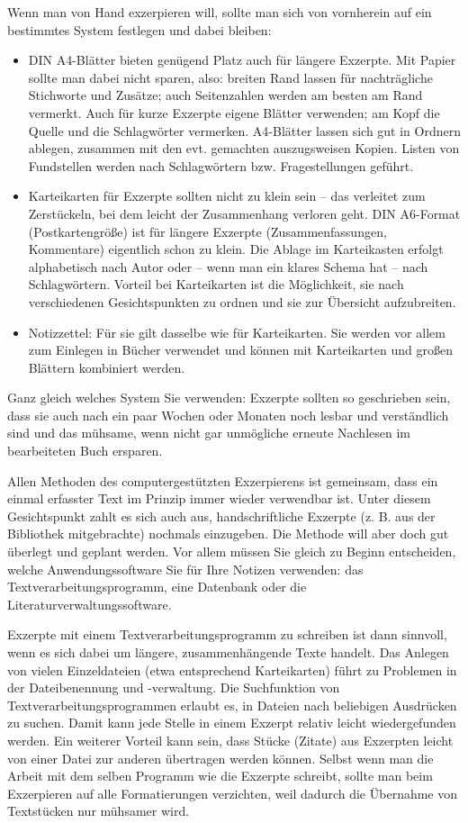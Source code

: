 \documentclass[]{book}
\providecommand{\tightlist}{%
  \setlength{\itemsep}{0pt}\setlength{\parskip}{0pt}}
\theoremstyle{definition}
\theoremstyle{definition}
\theoremstyle{definition}
\theoremstyle{remark}
\begin{document}
Wenn man von Hand exzerpieren will, sollte man sich von vornherein auf
ein bestimmtes System festlegen und dabei bleiben:

\begin{itemize}
\tightlist
\item
  DIN A4-Blätter bieten genügend Platz auch für längere Exzerpte. Mit
  Papier sollte man dabei nicht sparen, also: breiten Rand lassen für
  nachträgliche Stichworte und Zusätze; auch Seitenzahlen werden am
  besten am Rand vermerkt. Auch für kurze Exzerpte eigene Blätter
  verwenden; am Kopf die Quelle und die Schlagwörter vermerken.
  A4-Blätter lassen sich gut in Ordnern ablegen, zusammen mit den evt.
  gemachten auszugsweisen Kopien. Listen von Fundstellen werden nach
  Schlagwörtern bzw. Fragestellungen geführt.
\item
  Karteikarten für Exzerpte sollten nicht zu klein sein -- das verleitet
  zum Zerstückeln, bei dem leicht der Zusammenhang verloren geht. DIN
  A6-Format (Postkartengröße) ist für längere Exzerpte
  (Zusammenfassungen, Kommentare) eigentlich schon zu klein. Die Ablage
  im Karteikasten erfolgt alphabetisch nach Autor oder -- wenn man ein
  klares Schema hat -- nach Schlagwörtern. Vorteil bei Karteikarten ist
  die Möglichkeit, sie nach verschiedenen Gesichtspunkten zu ordnen und
  sie zur Übersicht aufzubreiten.
\item
  Notizzettel: Für sie gilt dasselbe wie für Karteikarten. Sie werden
  vor allem zum Einlegen in Bücher verwendet und können mit Karteikarten
  und großen Blättern kombiniert werden.
\end{itemize}

Ganz gleich welches System Sie verwenden: Exzerpte sollten so
geschrieben sein, dass sie auch nach ein paar Wochen oder Monaten noch
lesbar und verständlich sind und das mühsame, wenn nicht gar unmögliche
erneute Nachlesen im bearbeiteten Buch ersparen.

Allen Methoden des computergestützten Exzerpierens ist gemeinsam, dass
ein einmal erfasster Text im Prinzip immer wieder verwendbar ist. Unter
diesem Gesichtspunkt zahlt es sich auch aus, handschriftliche Exzerpte
(z. B. aus der Bibliothek mitgebrachte) nochmals einzugeben. Die Methode
will aber doch gut überlegt und geplant werden. Vor allem müssen Sie
gleich zu Beginn entscheiden, welche Anwendungssoftware Sie für Ihre
Notizen verwenden: das Textverarbeitungsprogramm, eine Datenbank oder
die Literaturverwaltungssoftware.

Exzerpte mit einem Textverarbeitungsprogramm zu schreiben ist dann
sinnvoll, wenn es sich dabei um längere, zusammenhängende Texte handelt.
Das Anlegen von vielen Einzeldateien (etwa entsprechend Karteikarten)
führt zu Problemen in der Dateibenennung und -verwaltung. Die
Suchfunktion von Textverarbeitungsprogrammen erlaubt es, in Dateien nach
beliebigen Ausdrücken zu suchen. Damit kann jede Stelle in einem Exzerpt
relativ leicht wiedergefunden werden. Ein weiterer Vorteil kann sein,
dass Stücke (Zitate) aus Exzerpten leicht von einer Datei zur anderen
übertragen werden können. Selbst wenn man die Arbeit mit dem selben
Programm wie die Exzerpte schreibt, sollte man beim Exzerpieren auf alle
Formatierungen verzichten, weil dadurch die Übernahme von Textstücken
nur mühsamer wird.
\end{document}
